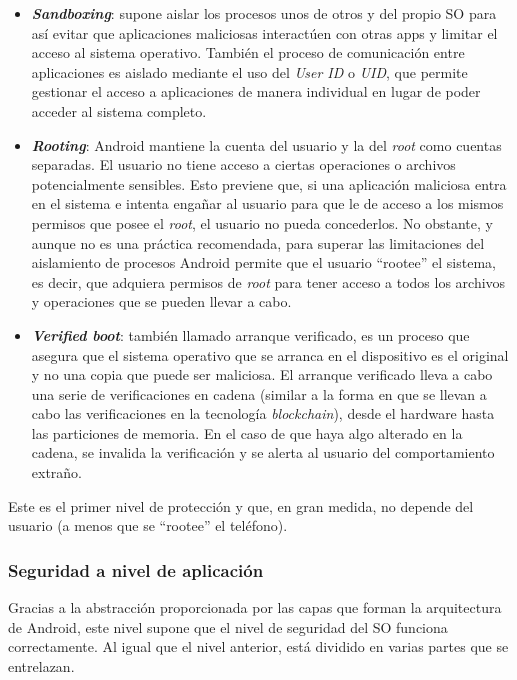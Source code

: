 \begin{itemize}
	\item \textit{\textbf{Sandboxing}}: supone aislar los procesos unos de otros y del propio SO para así evitar que aplicaciones maliciosas interactúen con otras apps y limitar el acceso al sistema operativo. También el proceso de comunicación entre aplicaciones es aislado mediante el uso del \textit{User ID} o \textit{UID}, que permite gestionar el acceso a aplicaciones de manera individual en lugar de poder acceder al sistema completo.
	\item \textit{\textbf{Rooting}}: Android mantiene la cuenta del usuario y la del \textit{root} como cuentas separadas. El usuario no tiene acceso a ciertas operaciones o archivos potencialmente sensibles. Esto previene que, si una aplicación maliciosa entra en el sistema e intenta engañar al usuario para que le de acceso a los mismos permisos que posee el \textit{root}, el usuario no pueda concederlos. No obstante, y aunque no es una práctica recomendada, para superar las limitaciones del aislamiento de procesos Android permite que el usuario ``rootee'' el sistema, es decir, que adquiera permisos de \textit{root} para tener acceso a todos los archivos y operaciones que se pueden llevar a cabo.
	\item \textit{\textbf{Verified boot}}: también llamado arranque verificado, es un proceso que asegura que el sistema operativo que se arranca en el dispositivo es el original y no una copia que puede ser maliciosa. El arranque verificado lleva a cabo una serie de verificaciones en cadena (similar a la forma en que se llevan a cabo las verificaciones en la tecnología \textit{blockchain}), desde el hardware hasta las particiones de memoria. En el caso de que haya algo alterado en la cadena, se invalida la verificación y se alerta al usuario del comportamiento extraño.
\end{itemize}

Este es el primer nivel de protección y que, en gran medida, no depende del usuario (a menos que se ``rootee'' el teléfono).

\subsubsection{Seguridad a nivel de aplicación}

Gracias a la abstracción proporcionada por las capas que forman la arquitectura de Android, este nivel supone que el nivel de seguridad del SO funciona correctamente. Al igual que el nivel anterior, está dividido en varias partes que se entrelazan.

